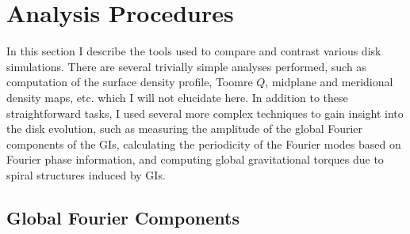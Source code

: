 \section{Analysis Procedures}\label{sec:IC:anal}

In this section I describe the tools used to compare and contrast various disk simulations. There are several trivially simple analyses performed, such as computation of the surface density profile, Toomre $Q$, midplane and meridional density maps, etc. which I will not elucidate here. In addition to these straightforward tasks, I used several more complex techniques to gain insight into the disk evolution, such as measuring the amplitude of the global Fourier components of the GIs, calculating the periodicity of the Fourier modes based on Fourier phase information, and computing global gravitational torques due to spiral structures induced by GIs.
 
\subsection{Global Fourier Components}\label{sec:IC:am}

